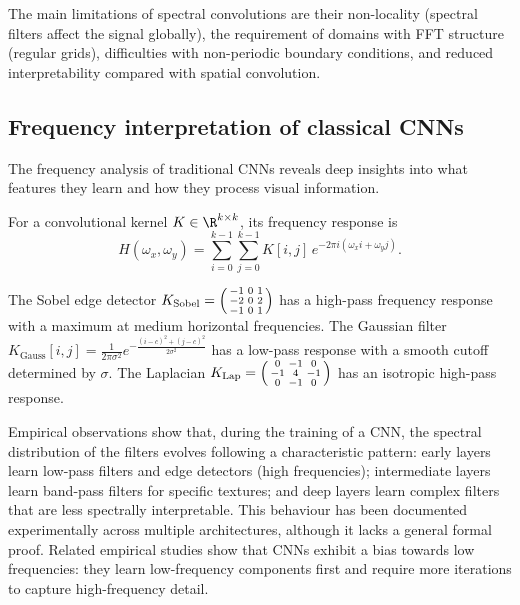 The main limitations of spectral convolutions are their non-locality (spectral
filters affect the signal globally), the requirement of domains with FFT
structure (regular grids), difficulties with non-periodic boundary conditions,
and reduced interpretability compared with spatial convolution.

\subsection{Frequency interpretation of classical CNNs}
\label{sec:grids:freq-interpretation}

The frequency analysis of traditional CNNs reveals deep insights into what
features they learn and how they process visual information.

\begin{definition}
\label{def:grids:freq-response}
For a convolutional kernel $K \in \R^{k \times k}$, its frequency response is
\[
  H(\omega_x, \omega_y) = \sum_{i=0}^{k-1} \sum_{j=0}^{k-1} K[i,j]\,
    e^{-2\pi i(\omega_x i + \omega_y j)}.
\]
\end{definition}

\begin{example}
\label{ex:grids:common-kernels}
The Sobel edge detector $K_{\text{Sobel}} = \begin{psmallmatrix} -1 & 0 & 1 \\
-2 & 0 & 2 \\ -1 & 0 & 1 \end{psmallmatrix}$ has a high-pass frequency response
with a maximum at medium horizontal frequencies. The Gaussian filter
$K_{\text{Gauss}}[i,j] = \frac{1}{2\pi\sigma^2}
e^{-\frac{(i-c)^2 + (j-c)^2}{2\sigma^2}}$ has a low-pass response with a smooth
cutoff determined by $\sigma$. The Laplacian
$K_{\text{Lap}} = \begin{psmallmatrix} 0 & -1 & 0 \\ -1 & 4 & -1 \\ 0 & -1 & 0
\end{psmallmatrix}$ has an isotropic high-pass response.
\end{example}

\begin{remark}
\label{rem:grids:spectral-evolution}
Empirical observations show that, during the training of a CNN, the spectral
distribution of the filters evolves following a characteristic pattern: early
layers learn low-pass filters and edge detectors (high frequencies);
intermediate layers learn band-pass filters for specific textures; and deep
layers learn complex filters that are less spectrally interpretable. This
behaviour has been documented experimentally across multiple architectures,
although it lacks a general formal proof. Related empirical studies show that
CNNs exhibit a bias towards low frequencies: they learn low-frequency components
first and require more iterations to capture high-frequency detail.
\end{remark}

